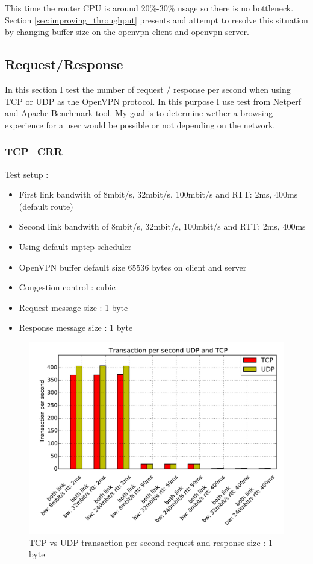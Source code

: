 This time the router CPU is around 20\%-30\% usage so there is no bottleneck.
Section \ref{sec:improving_throughput} presents and attempt to resolve this situation by changing buffer size on the openvpn client and openvpn server.

\newpage

\subsection{Request/Response}

In this section I test the number of request / response per second when using TCP or UDP as the OpenVPN protocol. In this purpose I use test from Netperf and Apache Benchmark tool.
My goal is to determine wether a browsing experience for a user would be possible or not depending on the network.

\subsubsection{TCP\_CRR}

  Test setup :

  \begin{itemize}
  \item First link bandwith of 8mbit/s, 32mbit/s, 100mbit/s  and RTT: 2ms, 400ms (default route)
  \item Second link bandwith of 8mbit/s, 32mbit/s, 100mbit/s  and RTT: 2ms, 400ms
  \item Using default mptcp scheduler
  \item OpenVPN buffer default size 65536 bytes on client and server
  \item Congestion control : cubic
  \item Request message size : 1 byte
  \item Response message size : 1 byte
  \end{itemize}

  \begin{figure}[h!]
    \centering
    \includegraphics[width=16cm]{../results/tcp_vs_udp_transaction.pdf}
    \caption{TCP vs UDP transaction per second request and response size : 1 byte}
    \label{tcp_vs_udp_transaction}
  \end{figure}

